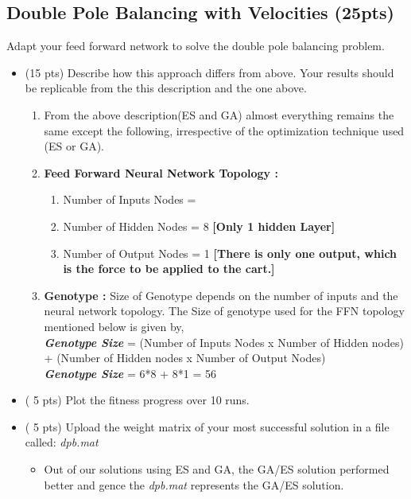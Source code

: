 \documentclass{article}
\begin{document}
\subsection{Double Pole Balancing with Velocities (25pts)}
Adapt your feed forward network to solve the double pole balancing problem.
\begin{itemize}
	\item (15 pts) Describe how this approach differs from above. Your results should be replicable from the this description and the one above.
\color{blue}
\begin{enumerate}
	\item From the above description(ES and GA) almost everything remains the same except the following, irrespective of the optimization technique used (ES or GA).
	\item \textbf{Feed Forward Neural Network Topology :}
	\begin{enumerate}
	\item Number of Inputs Nodes = \color{red}{6 = [Cart Position, Cart Velocity, Pole1 Position, Pole1 Angular Velocity, Pole2 Position, Pole2 Angular Velocity]} \color{blue}
	\item Number of Hidden Nodes = 8 \textbf{[Only 1 hidden Layer]}
	\item Number of Output Nodes = 1 \textbf{[There is only one output, which is the force to be applied to the cart.]}
	\end{enumerate}
	\item \textbf{Genotype :} Size of Genotype depends on the number of inputs and the neural network topology. The Size of genotype used for the FFN topology mentioned below is given by, \\
	\textit{\textbf{Genotype Size}} = (Number of Inputs Nodes x Number of Hidden nodes) + (Number of Hidden nodes x Number of Output Nodes)\\
	\textbf{\textit{Genotype Size}} = \color{red}6\color{blue}*8 + 8*1 = \color{red}56\color{blue}
\end{enumerate}
\color{black}	
	\item ( 5 pts) Plot the fitness progress over 10 runs.
	\item ( 5 pts) Upload the weight matrix of your most successful solution in a file called: \textit{dpb.mat}
	\begin{itemize}
\color{blue}
	\item Out of our solutions using ES and GA, the GA/ES solution performed better and gence the \textit{dpb.mat} represents the GA/ES solution.
\color{black} 
	\end{itemize}
\end{itemize}
\end{document}
